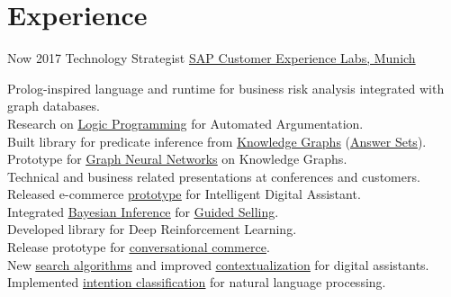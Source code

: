 \documentclass[letterpaper]{twentysecondcv} %
\begin{document}
 \makeprofile %


\section{Experience}

\begin{twenty} %
\twentyitem
    	{Now}
		{2017}
        {Technology Strategist}
        {\href{https://cxlabs.sap.com/}{SAP Customer Experience Labs, Munich}}
        {}
        {
        Prolog-inspired language and runtime for business risk analysis integrated with graph databases.\\
        Research on \href{https://cxlabs.sap.com/2020/11/16/why-logic-programming-matters/}{\underline{Logic Programming}} for Automated Argumentation.\\
        Built library for predicate inference from \href{https://blogs.sap.com/2020/08/13/what-are-knowledge-graphs-an-overview/}{\underline{Knowledge Graphs}} (\href{https://blogs.sap.com/2020/11/25/rule-engines-and-knowledge-intensive-processing-with-answer-set-programming/}{\underline{Answer Sets}}).
        Prototype for \href{https://gfrison.com/2020/graph-convolution-networks}{\underline{Graph Neural Networks}} on Knowledge Graphs.\\
        Technical and business related presentations at conferences and customers.\\ 
        Released e-commerce \href{https://blogs.sap.com/tag/zefiro/}{\underline{prototype}} for Intelligent Digital Assistant.\\ 
        Integrated \href{https://github.com/sap/bayesian-network-builder}{\underline{Bayesian Inference}} for \href{https://blogs.sap.com/2020/09/22/bayesian-inference-for-guided-selling-sap-predictive-summit-talk/}{\underline{Guided Selling}}.\\
        Developed library for Deep Reinforcement Learning.\\
        Release prototype for \href{https://sapvideoa35699dc5.hana.ondemand.com/?entry_id=1_kp5hbyih}{\underline{conversational commerce}}.\\
        New \href{https://blogs.sap.com/2021/09/01/improve-conversational-commerce-search-with-knowledge-graphs/}{\underline{search algorithms}} and improved \href{https://gfrison.com/2018/03/14/stochastic-conversational-workflows/}{\underline{contextualization}}  for digital assistants. \\
        Implemented \href{https://gfrison.com/2017/09/01/deeplearning-in-text-classification/}{\underline{intention classification}} for natural language processing.
        
}
\end{twenty}
\end{document}
